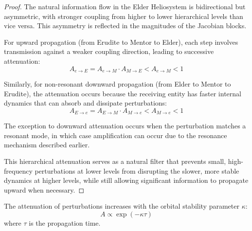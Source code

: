 \begin{proof}
The natural information flow in the Elder Heliosystem is bidirectional but asymmetric, with stronger coupling from higher to lower hierarchical levels than vice versa. This asymmetry is reflected in the magnitudes of the Jacobian blocks.

For upward propagation (from Erudite to Mentor to Elder), each step involves transmission against a weaker coupling direction, leading to successive attenuation:
\begin{equation}
A_{e \to E} = A_{e \to M} \cdot A_{M \to E} < A_{e \to M} < 1
\end{equation}

Similarly, for non-resonant downward propagation (from Elder to Mentor to Erudite), the attenuation occurs because the receiving entity has faster internal dynamics that can absorb and dissipate perturbations:
\begin{equation}
A_{E \to e} = A_{E \to M} \cdot A_{M \to e} < A_{M \to e} < 1
\end{equation}

The exception to downward attenuation occurs when the perturbation matches a resonant mode, in which case amplification can occur due to the resonance mechanism described earlier.

This hierarchical attenuation serves as a natural filter that prevents small, high-frequency perturbations at lower levels from disrupting the slower, more stable dynamics at higher levels, while still allowing significant information to propagate upward when necessary.
\end{proof}

\begin{theorem}
The attenuation of perturbations increases with the orbital stability parameter $\kappa$:
\begin{equation}
A \propto \exp(-\kappa \tau)
\end{equation}
where $\tau$ is the propagation time.
\end{theorem}

